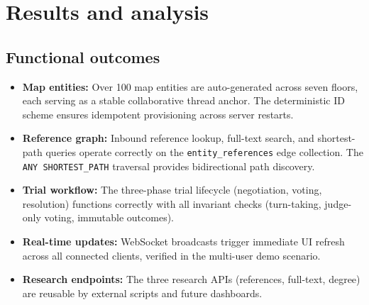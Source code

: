 \documentclass[13pt,a4paper]{report}
\begin{document}
\section{Results and analysis}
\subsection{Functional outcomes}
\begin{itemize}
    \item \textbf{Map entities:} Over 100 map entities are auto-generated across seven floors, each serving as a stable collaborative thread anchor. The deterministic ID scheme ensures idempotent provisioning across server restarts.
    \item \textbf{Reference graph:} Inbound reference lookup, full-text search, and shortest-path queries operate correctly on the \texttt{entity\_references} edge collection. The \texttt{ANY SHORTEST\_PATH} traversal provides bidirectional path discovery.
    \item \textbf{Trial workflow:} The three-phase trial lifecycle (negotiation, voting, resolution) functions correctly with all invariant checks (turn-taking, judge-only voting, immutable outcomes).
    \item \textbf{Real-time updates:} WebSocket broadcasts trigger immediate UI refresh across all connected clients, verified in the multi-user demo scenario.
    \item \textbf{Research endpoints:} The three research APIs (references, full-text, degree) are reusable by external scripts and future dashboards.
\end{itemize}
\end{document}
